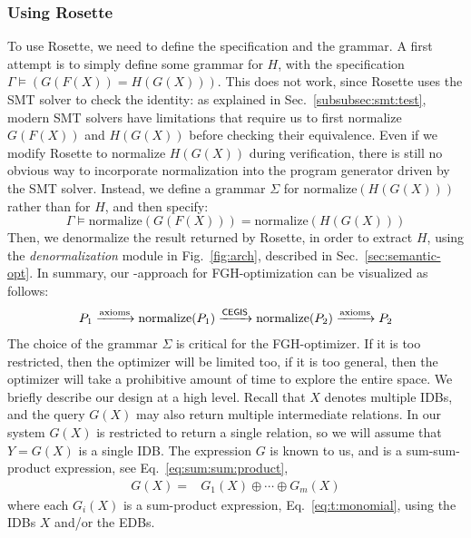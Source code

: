 \subsubsection{Using Rosette} To use Rosette, we need to define the
specification and the grammar. A first attempt is to simply define
some grammar for $H$, with the specification
$\Gamma \models \left(G(F(X)) = H(G(X))\right)$.  This does not work,
since Rosette uses the SMT solver to check the identity: as explained
in Sec.~\ref{subsubsec:smt:test}, modern SMT solvers have limitations
that require us to first normalize $G(F(X))$ and $H(G(X))$ before
checking their equivalence.
Even if we modify Rosette
to normalize $H(G(X))$ during verification,
there is still no obvious way to incorporate normalization
into the program generator driven by the SMT solver.
Instead,
we define a grammar $\Sigma$ for $\text{normalize}(H(G(X)))$ rather
than for $H$, and then specify:
\[
\Gamma \models \text{normalize}(G(F(X))) = \text{normalize}(H(G(X)))
\]
Then, we denormalize the result
returned by Rosette, in order to extract $H$, using the {\em
  denormalization} module in Fig.~\ref{fig:arch}, described in
Sec.~\ref{sec:semantic-opt}.  In summary, our \cegis-approach for
FGH-optimization can be visualized as follows:
%
\begin{align}
  P_{1} \xrightarrow[]{\text{axioms}} \text{normalize}(P_{1}) \xrightarrow[]{\textsf{CEGIS}} \text{normalize}(P_{2}) \xrightarrow[]{\text{axioms}} P_{2}
  \label{eq:synthesis:cegis2}
\end{align}
%
The choice of the grammar $\Sigma$ is critical for the FGH-optimizer.
If it is too restricted, then the optimizer will be limited too, if it
is too general, then the optimizer will take a prohibitive amount of
time to explore the entire space.  We briefly describe our design at a
high level.  Recall that $X$ denotes multiple IDBs, and the query
$G(X)$ may also return multiple intermediate relations. In our system
$G(X)$ is restricted to return a single relation, so we will assume
that $Y = G(X)$ is a single IDB.  The expression $G$ is known to us,
and is a sum-sum-product expression, see
Eq.~\eqref{eq:sum:sum:product},
%
\begin{align*}
  G(X) = & G_1(X) \oplus \cdots \oplus G_m(X)
\end{align*}
%
where each $G_i(X)$ is a sum-product expression,
Eq.~\eqref{eq:t:monomial}, using the IDBs $X$ and/or the EDBs.

